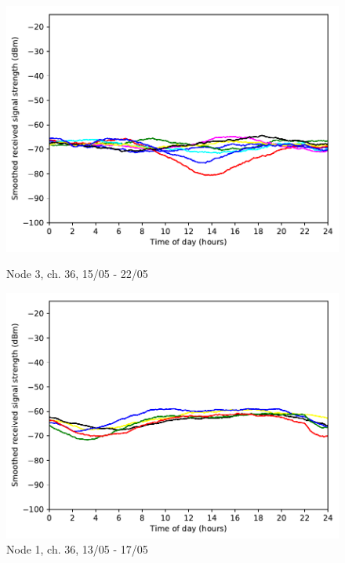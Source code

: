 \documentclass[a4paper, 11pt]{article}
\begin{document}
\begin{figure}[!ht]
\begin{minipage}{0.47\textwidth}
	\centering
	\includegraphics[width=\textwidth]{images/5_GHz/cot-node3-student_2017-05-22_chan36_image.pdf}
	\caption{Node 3, ch. 36, 15/05 - 22/05}
	\label{node3_ch36_usage}
\end{minipage}\hfill
\begin{minipage}{0.47\textwidth}
	\centering
	\includegraphics[width=\textwidth]{images/5_GHz/node1_2017-05-17_chan36_image.pdf}
	\caption{Node 1, ch. 36, 13/05 - 17/05}
	\label{node1_ch36_usage}
\end{minipage}\hfill
\begin{minipage}{0.47\textwidth}
	\centering

\end{minipage}
\end{figure}
\end{document}
